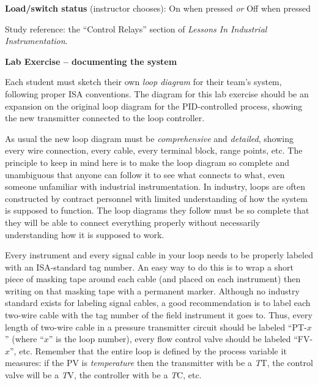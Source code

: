 \documentclass[12pt,a4paper]{article}
\begin{document}
\vskip 20pt

\noindent
{\bf Load/switch status} (instructor chooses): \hskip 20pt \underbar{\hskip 20pt} On when pressed \hskip 10pt {\it or} \hskip 10pt \underbar{\hskip 20pt} Off when pressed

\vfil

Study reference: the ``Control Relays'' section of {\it Lessons In Industrial Instrumentation}.







\vfil \eject

\noindent
{\bf Lab Exercise -- documenting the system}

\vskip 5pt

Each student must sketch their own {\it loop diagram} for their team's system, following proper ISA conventions.  The diagram for this lab exercise should be an expansion on the original loop diagram for the PID-controlled process, showing the new transmitter connected to the loop controller.

As usual the new loop diagram must be {\it comprehensive} and {\it detailed}, showing every wire connection, every cable, every terminal block, range points, etc.  The principle to keep in mind here is to make the loop diagram so complete and unambiguous that anyone can follow it to see what connects to what, even someone unfamiliar with industrial instrumentation.  In industry, loops are often constructed by contract personnel with limited understanding of how the system is supposed to function.  The loop diagrams they follow must be so complete that they will be able to connect everything properly without necessarily understanding how it is supposed to work.

Every instrument and every signal cable in your loop needs to be properly labeled with an ISA-standard tag number.  An easy way to do this is to wrap a short piece of masking tape around each cable (and placed on each instrument) then writing on that masking tape with a permanent marker.  Although no industry standard exists for labeling signal cables, a good recommendation is to label each two-wire cable with the tag number of the field instrument it goes to.  Thus, every length of two-wire cable in a pressure transmitter circuit should be labeled ``PT-$x$'' (where ``$x$'' is the loop number), every flow control valve should be labeled ``FV-$x$'', etc.  Remember that the entire loop is defined by the process variable it measures: if the PV is {\it temperature} then the transmitter with be a {\it T}T, the control valve will be a {\it T}V, the controller with be a {\it T}C, etc.
\end{document}
